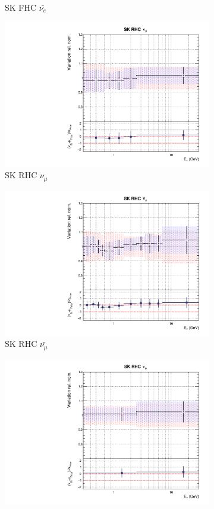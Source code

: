 \begin{figure}[t]
\begin{subfigure}{0.42\textwidth}
  \caption{SK FHC $\bar{\nu_e}$}
\end{subfigure}
\begin{subfigure}{0.42\textwidth}
  \centering
  \includegraphics[width=0.75\linewidth]{figs/rhcmpdat248flux_12}
  \caption{SK RHC $\nu_{\mu}$}
\end{subfigure}
\begin{subfigure}{0.42\textwidth}
  \centering
  \includegraphics[width=0.75\linewidth]{figs/rhcmpdat248flux_13}
  \caption{SK RHC $\bar{\nu_{\mu}}$}
\end{subfigure}
\begin{subfigure}{0.42\textwidth}
  \centering
  \includegraphics[width=0.75\linewidth]{figs/rhcmpdat248flux_14}

\end{subfigure}
\end{figure}
